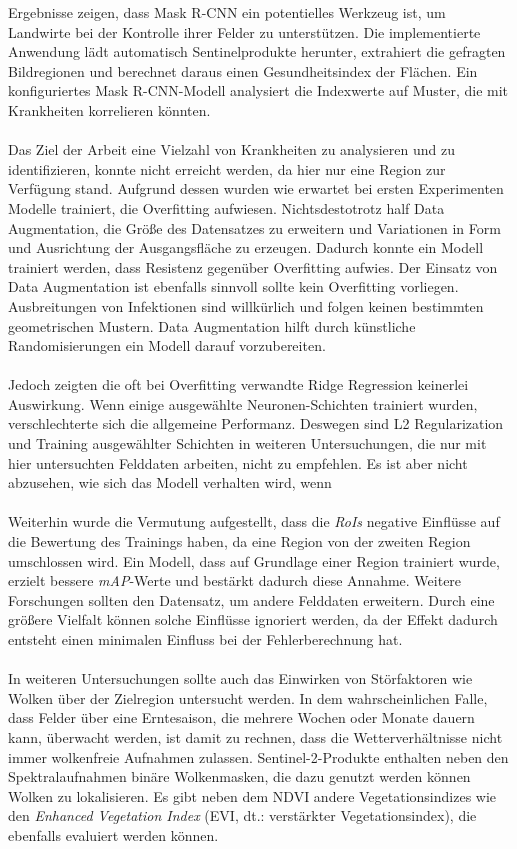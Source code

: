 Ergebnisse zeigen, dass Mask R-CNN ein potentielles Werkzeug ist, um Landwirte bei der Kontrolle ihrer Felder zu unterstützen. Die implementierte Anwendung lädt automatisch Sentinelprodukte herunter, extrahiert die gefragten Bildregionen und berechnet daraus einen Gesundheitsindex der Flächen. Ein konfiguriertes Mask R-CNN-Modell analysiert die Indexwerte auf Muster, die mit Krankheiten korrelieren könnten. 
\\\\
Das Ziel der Arbeit eine Vielzahl von Krankheiten zu analysieren und zu identifizieren, konnte nicht erreicht werden, da hier nur eine Region zur Verfügung stand. Aufgrund dessen wurden wie erwartet bei ersten Experimenten Modelle trainiert, die Overfitting aufwiesen. Nichtsdestotrotz half Data Augmentation, die Größe des Datensatzes zu erweitern und Variationen in Form und Ausrichtung der Ausgangsfläche zu erzeugen. Dadurch konnte ein Modell trainiert werden, dass Resistenz gegenüber Overfitting aufwies. Der Einsatz von Data Augmentation ist ebenfalls sinnvoll sollte kein Overfitting vorliegen. Ausbreitungen von Infektionen sind willkürlich und folgen keinen bestimmten geometrischen Mustern. Data Augmentation hilft durch künstliche Randomisierungen ein Modell darauf vorzubereiten.
\\\\
Jedoch zeigten die oft bei Overfitting verwandte Ridge Regression keinerlei Auswirkung. Wenn einige ausgewählte Neuronen-Schichten trainiert wurden, verschlechterte sich die allgemeine Performanz. Deswegen sind L2 Regularization und Training ausgewählter Schichten in weiteren Untersuchungen, die nur mit hier untersuchten Felddaten arbeiten, nicht zu empfehlen. Es ist aber nicht abzusehen, wie sich das Modell verhalten wird, wenn 
\\\\
Weiterhin wurde die Vermutung aufgestellt, dass die \textit{RoIs} negative Einflüsse auf die Bewertung des Trainings haben, da eine Region von der zweiten Region umschlossen wird. Ein Modell, dass auf Grundlage einer Region trainiert wurde, erzielt bessere \textit{mAP}-Werte und bestärkt dadurch diese Annahme. Weitere Forschungen sollten den Datensatz, um andere Felddaten erweitern. Durch eine größere Vielfalt können solche Einflüsse ignoriert werden, da der Effekt dadurch entsteht einen minimalen Einfluss bei der Fehlerberechnung hat. 
\\\\
In weiteren Untersuchungen sollte auch das Einwirken von Störfaktoren wie Wolken über der Zielregion untersucht werden. In dem wahrscheinlichen Falle, dass Felder über eine Erntesaison, die mehrere Wochen oder Monate dauern kann, überwacht werden, ist damit zu rechnen, dass die Wetterverhältnisse nicht immer wolkenfreie Aufnahmen zulassen. Sentinel-2-Produkte enthalten neben den Spektralaufnahmen binäre Wolkenmasken, die dazu genutzt werden können Wolken zu lokalisieren. Es gibt neben dem NDVI andere Vegetationsindizes wie den \textit{Enhanced Vegetation Index} (EVI, dt.: verstärkter Vegetationsindex), die ebenfalls evaluiert werden können.